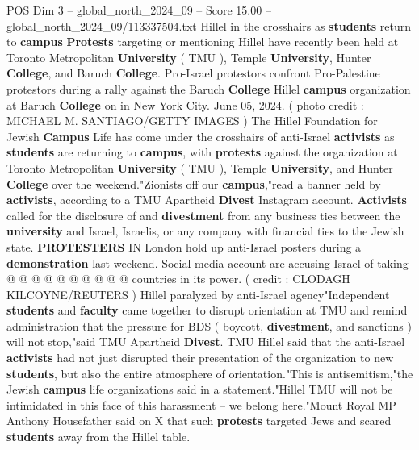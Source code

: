 \begin{textsample}{POS Dim 3 – global\_north\_2024\_09 – Score 15.00 – global\_north\_2024\_09/113337504.txt}  \label{ex:f3_pos_168}
Hillel in the crosshairs as \textbf{students} return to \textbf{campus} \textbf{Protests} targeting or mentioning Hillel have recently been held at Toronto Metropolitan \textbf{University} ( TMU ), Temple \textbf{University}, Hunter \textbf{College}, and Baruch \textbf{College}.
Pro-Israel protestors confront Pro-Palestine protestors during a rally against the Baruch \textbf{College} Hillel \textbf{campus} organization at Baruch \textbf{College} on in New York City.
June 05, 2024. ( photo credit : MICHAEL M.
SANTIAGO/GETTY IMAGES ) The Hillel Foundation for Jewish \textbf{Campus} Life has come under the crosshairs of anti-Israel \textbf{activists} as \textbf{students} are returning to \textbf{campus}, with \textbf{protests} against the organization at Toronto Metropolitan \textbf{University} ( TMU ), Temple \textbf{University}, and Hunter \textbf{College} over the weekend."Zionists off our \textbf{campus},"read a banner held by \textbf{activists}, according to a TMU Apartheid \textbf{Divest} Instagram account. \textbf{Activists} called for the disclosure of and \textbf{divestment} from any business ties between the \textbf{university} and Israel, Israelis, or any company with financial ties to the Jewish state. \textbf{PROTESTERS} IN London hold up anti-Israel posters during a \textbf{demonstration} last weekend.
Social media account are accusing Israel of taking @ @ @ @ @ @ @ @ @ @ countries in its power. ( credit : CLODAGH KILCOYNE/REUTERS ) Hillel paralyzed by anti-Israel agency"Independent \textbf{students} and \textbf{faculty} came together to disrupt orientation at TMU and remind administration that the pressure for BDS ( boycott, \textbf{divestment}, and sanctions ) will not stop,"said TMU Apartheid \textbf{Divest}.
TMU Hillel said that the anti-Israel \textbf{activists} had not just disrupted their presentation of the organization to new \textbf{students}, but also the entire atmosphere of orientation."This is antisemitism,"the Jewish \textbf{campus} life organizations said in a statement."Hillel TMU will not be intimidated in this face of this harassment -- we belong here."Mount Royal MP Anthony Housefather said on X that such \textbf{protests} targeted Jews and scared \textbf{students} away from the Hillel table.

\end{textsample}
